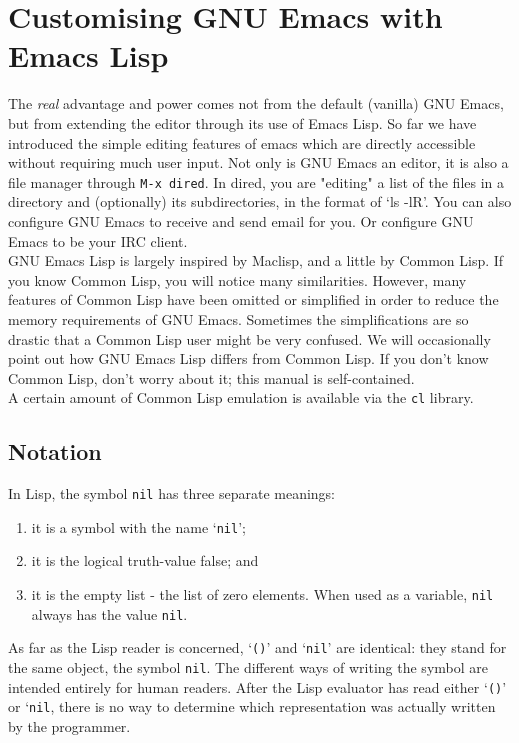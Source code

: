 \documentclass[12pt,a4paper,oneside]{article}
\begin{document}
\section{Customising GNU Emacs with Emacs Lisp}
The \emph{real} advantage and power comes not from the default (vanilla) GNU Emacs, but from extending the editor through its use of Emacs Lisp.  So far we have introduced the simple editing features of emacs which are directly accessible without requiring much user input.  Not only is GNU Emacs an editor, it is also a file manager through \texttt{M-x dired}.  In dired, you are "editing" a list of the files in a directory and (optionally) its subdirectories, in the format of `ls -lR'. You can also configure GNU Emacs to receive and send email for you. Or configure GNU Emacs to be your IRC client.\\

GNU Emacs Lisp is largely inspired by Maclisp, and a little by Common Lisp. If you know Common Lisp, you will notice many similarities. However, many features of Common Lisp have been omitted or simplified in order to reduce the memory requirements of GNU Emacs. Sometimes the simplifications are so drastic that a Common Lisp user might be very confused. We will occasionally point out how GNU Emacs Lisp differs from Common Lisp. If you don't know Common Lisp, don't worry about it; this manual is self-contained.\\

A certain amount of Common Lisp emulation is available via the \texttt{cl} library.

\subsection{Notation}
In Lisp, the symbol \texttt{nil} has three separate meanings:
\begin{enumerate}
  \item it is a symbol with the name `\texttt{nil}';
  \item it is the logical truth-value false; and
  \item it is the empty list - the list of zero elements. When used as a variable, \texttt{nil} always has the value \texttt{nil}.
\end{enumerate}

As far as the Lisp reader is concerned, `\texttt{()}' and `\texttt{nil}' are identical: they stand for the same object, the symbol \texttt{nil}. The different ways of writing the symbol are intended entirely for human readers. After the Lisp evaluator has read either `\texttt{()}' or `\texttt{nil}, there is no way to determine which representation was actually written by the programmer.\\
\end{document}

